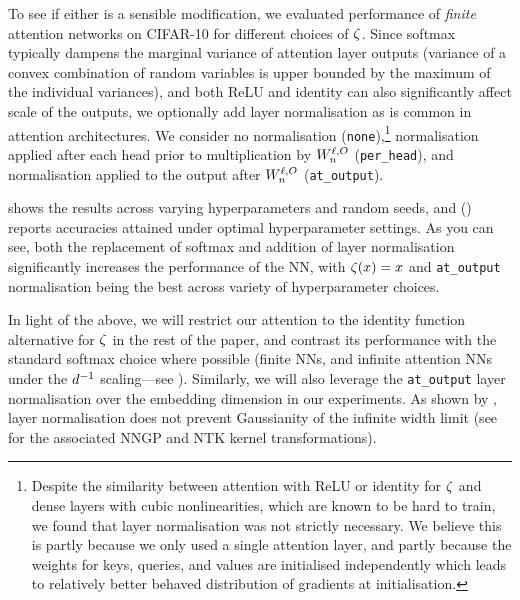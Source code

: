 \documentclass{article}
\begin{document}
To see if either is a sensible modification, we evaluated performance of \emph{finite} attention networks on CIFAR-10 for different choices of $\zeta$.
Since softmax typically dampens the marginal variance of attention layer outputs (variance of a convex combination of random variables is upper bounded by the maximum of the individual variances), and both ReLU and identity can also significantly affect scale of the outputs, we optionally add layer normalisation as is common in attention architectures.
We consider no normalisation (\texttt{none}),\footnote{Despite the similarity between attention with ReLU or identity for $\zeta$ and dense layers with cubic nonlinearities, which are known to be hard to train, we found that layer normalisation was not strictly necessary.
We believe this is partly because we only used a single attention layer, and partly because the weights for keys, queries, and values are initialised independently which leads to relatively better behaved distribution of gradients at initialisation.} 
normalisation applied after each head prior to multiplication by $W_{n}^{\ell, O}$ (\texttt{per\_head}), and normalisation applied to the output after $W_{n}^{\ell, O}$ (\texttt{at\_output}).

 shows the results across varying hyperparameters and random seeds, and  () reports accuracies attained under optimal hyperparameter settings.
As you can see, both the replacement of softmax and addition of layer normalisation significantly increases the performance of the NN, with $\zeta(x) = x$ and \texttt{at\_output} normalisation being the best across variety of hyperparameter choices. 

In light of the above, we will restrict our attention to the identity function alternative for $\zeta$ in the rest of the paper, and contrast its performance with the standard softmax choice where possible (finite NNs, and infinite attention NNs under the $d^{-1}$ scaling---see ).
Similarly, we will also leverage the \texttt{at\_output} layer normalisation over the embedding dimension in our experiments.
As shown by \citet[appendix A]{yang2019v2}, layer normalisation does not prevent Gaussianity of the infinite width limit (see  for the associated NNGP and NTK kernel transformations).
\end{document}
